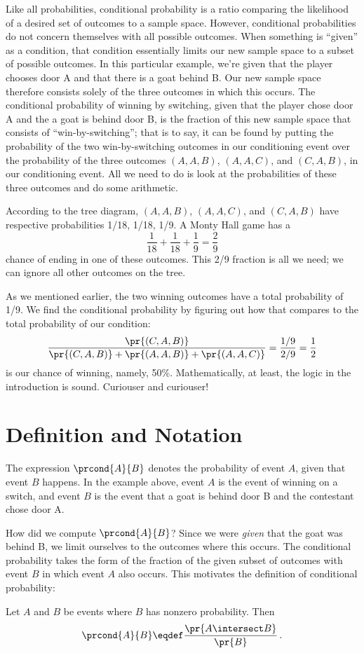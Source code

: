 Like all probabilities, conditional probability is a ratio comparing
the likelihood of a desired set of outcomes to a sample
space. However, conditional probabilities do not concern themselves
with all possible outcomes.  When something is ``given'' as a
condition, that condition essentially limits our new sample space to a
subset of possible outcomes.  In this particular example, we're given
that the player chooses door A and that there is a goat behind B.  Our
new sample space therefore consists solely of the three outcomes in
which this occurs.  The conditional probability of winning by
switching, given that the player chose door A and the a goat is behind
door B, is the fraction of this new sample space that consists of
``win-by-switching''; that is to say, it can be found by putting the
probability of the two win-by-switching outcomes in our conditioning
event over the probability of the three outcomes $(A, A, B)$, $(A, A,
C)$, and $(C, A, B)$, in our conditioning event.  All we need to do is
look at the probabilities of these three outcomes and do some
arithmetic.

According to the tree diagram, $(A, A, B)$, $(A, A, C)$, and $(C, A,
B)$ have respective probabilities 1/18, 1/18, 1/9.  A Monty Hall game
has a
\[
\frac{1}{18} + \frac{1}{18} + \frac{1}{9} = \frac{2}{9}
\]
chance of ending in one of these outcomes.  This 2/9 fraction is all
we need; we can ignore all other outcomes on the tree.

As we mentioned earlier, the two winning outcomes have a total
probability of 1/9.  We find the conditional probability by figuring
out how that compares to the total probability of our condition:
\[ 
\frac{\pr{(C, A, B)}}{\pr{(C, A, B)}+\pr{(A, A, B)}+\pr{(A, A, C)}} =
\frac{1/9}{2/9}=\frac{1}{2}
\]
is our chance of winning, namely, 50\%.  Mathematically, at least, the
logic in the introduction is sound.  Curiouser and curiouser!

\section{Definition and Notation}

The expression $\prcond{A}{B}$ denotes the probability of event $A$,
given that event $B$ happens.  In the example above, event $A$ is the
event of winning on a switch, and event $B$ is the event that a goat
is behind door B and the contestant chose door A.

How did we compute $\prcond{A}{B}$?  Since we were \emph{given} that
the goat was behind B, we limit ourselves to the outcomes where this
occurs.  The conditional probability takes the form of the fraction of
the given subset of outcomes with event $B$ in which event $A$ also
occurs.  This motivates the definition of conditional probability:
\begin{definition}\label{LN12:prcond}
Let $A$ and $B$ be events where $B$ has nonzero probability.  Then
\[
\prcond{A}{B} \eqdef \frac{\pr{A \intersect B}}{\pr{B}}\,.
\]
\end{definition}

